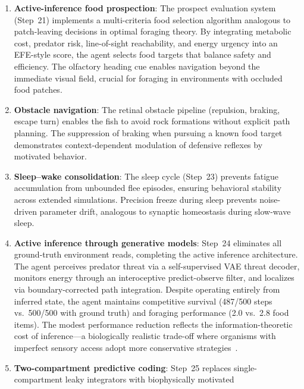 \documentclass[11pt,a4paper]{article}
\begin{document}
\begin{enumerate}[nosep]
    responses that outlast the visual stimulus, consistent with sustained
    amygdala activation in zebrafish pallium during predator avoidance.
    The energy-asymmetric flee cost creates a metabolic trade-off between
    safety and foraging efficiency.
  \item \textbf{Active-inference food prospection}: The prospect evaluation
    system (Step~21) implements a multi-criteria food selection algorithm
    analogous to patch-leaving decisions in optimal foraging theory.
    By integrating metabolic cost, predator risk, line-of-sight
    reachability, and energy urgency into an EFE-style score, the agent
    selects food targets that balance safety and efficiency.
    The olfactory heading cue enables navigation beyond the immediate visual
    field, crucial for foraging in environments with occluded food patches.
  \item \textbf{Obstacle navigation}: The retinal obstacle pipeline
    (repulsion, braking, escape turn) enables the fish to avoid rock
    formations without explicit path planning.
    The suppression of braking when pursuing a known food target demonstrates
    context-dependent modulation of defensive reflexes by motivated behavior.
  \item \textbf{Sleep--wake consolidation}: The sleep cycle (Step~23)
    prevents fatigue accumulation from unbounded flee episodes, ensuring
    behavioral stability across extended simulations.
    Precision freeze during sleep prevents noise-driven parameter drift,
    analogous to synaptic homeostasis during slow-wave sleep.
  \item \textbf{Active inference through generative models}: Step~24
    eliminates all ground-truth environment reads, completing the
    active inference architecture.
    The agent perceives predator threat via a self-supervised VAE threat
    decoder, monitors energy through an interoceptive predict-observe
    filter, and localizes via boundary-corrected path integration.
    Despite operating entirely from inferred state, the agent maintains
    competitive survival (487/500 steps vs.\ 500/500 with ground truth)
    and foraging performance (2.0 vs.\ 2.8 food items).
    The modest performance reduction reflects the information-theoretic
    cost of inference---a biologically realistic trade-off where organisms
    with imperfect sensory access adopt more conservative
    strategies~\cite{friston2010,dacosta2020}.
  \item \textbf{Two-compartment predictive coding}: Step~25 replaces
    single-compartment leaky integrators with biophysically motivated

\end{enumerate}
\end{document}
